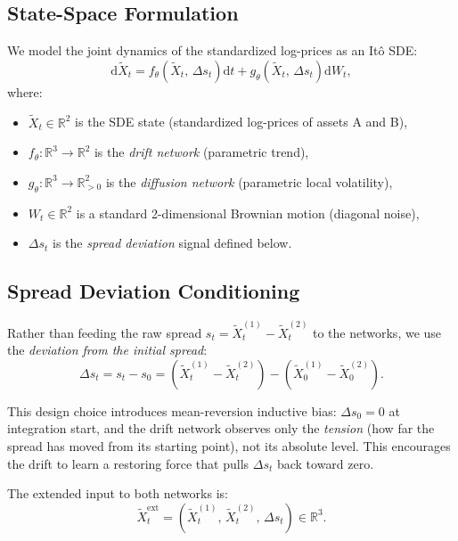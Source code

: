 \documentclass[11pt, a4paper]{article}
\newcommand{\R}{\mathbb{R}}
\newcommand{\dd}{\mathrm{d}}
\begin{document}
\subsection{State-Space Formulation}

We model the joint dynamics of the standardized log-prices as an Itô SDE:
\begin{equation}
\label{eq:sde}
    \dd \tilde{X}_t = f_\theta\!\left(\tilde{X}_t,\, \Delta s_t\right) \dd t + g_\theta\!\left(\tilde{X}_t,\, \Delta s_t\right) \dd W_t,
\end{equation}
where:
\begin{itemize}[nosep]
    \item $\tilde{X}_t \in \R^2$ is the SDE state (standardized log-prices of assets A and B),
    \item $f_\theta : \R^3 \to \R^2$ is the \emph{drift network} (parametric trend),
    \item $g_\theta : \R^3 \to \R^2_{>0}$ is the \emph{diffusion network} (parametric local volatility),
    \item $W_t \in \R^2$ is a standard 2-dimensional Brownian motion (diagonal noise),
    \item $\Delta s_t$ is the \emph{spread deviation} signal defined below.
\end{itemize}

\subsection{Spread Deviation Conditioning}

Rather than feeding the raw spread $s_t = \tilde{X}_t^{(1)} - \tilde{X}_t^{(2)}$ to the networks, we use the \emph{deviation from the initial spread}:
\begin{equation}
\label{eq:spread_dev}
    \Delta s_t = s_t - s_0 = \left(\tilde{X}_t^{(1)} - \tilde{X}_t^{(2)}\right) - \left(\tilde{X}_0^{(1)} - \tilde{X}_0^{(2)}\right).
\end{equation}

This design choice introduces mean-reversion inductive bias: $\Delta s_0 = 0$ at integration start, and the drift network observes only the \emph{tension} (how far the spread has moved from its starting point), not its absolute level. This encourages the drift to learn a restoring force that pulls $\Delta s_t$ back toward zero.

The extended input to both networks is:
\begin{equation}
    \tilde{X}_t^{\text{ext}} = \left(\tilde{X}_t^{(1)},\, \tilde{X}_t^{(2)},\, \Delta s_t\right) \in \R^3.
\end{equation}
\end{document}
